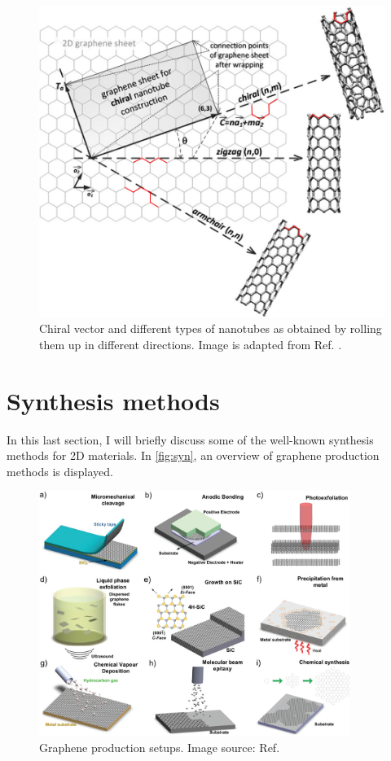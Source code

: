 \begin{figure}[htbp!] 
\centering  
\includegraphics[width=\textwidth]{chiral_vector.png}
\caption[Chiral vector and different types of nanotubes as obtained by rolling them up in different directions]{Chiral vector and different types of nanotubes as obtained by rolling them up in different directions. Image is adapted from Ref. \cite{Prasek2011}.}  
\label{fig:chiral}
\end{figure} 

\section{Synthesis methods}

In this last section, I will briefly discuss some of the well-known synthesis methods for 2D materials. In \autoref{fig:syn}, an overview of graphene production methods is displayed. 

\begin{figure}[htbp!] 
\centering  
\includegraphics[width=0.9\textwidth]{synthesis.png}
\caption[Graphene production setups]{Graphene production setups. Image source: Ref. \cite{Ferrari2015}}  
\label{fig:syn}
\end{figure} 
